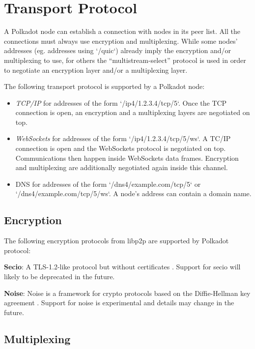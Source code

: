 \documentclass{book}
\newcommand{\tmem}[1]{{\em #1\/}}
\newcommand{\tmstrong}[1]{\textbf{#1}}
\begin{document}
\section{Transport Protocol}

A Polkadot node can establish a connection with nodes in its peer list. All
the connections must always use encryption and multiplexing. While some nodes'
addresses (eg. addresses using `/quic`) already imply the encryption and/or
multiplexing to use, for others the ``multistream-select'' protocol is used in
order to negotiate an encryption layer and/or a multiplexing layer.

The following transport protocol is supported by a Polkadot node:
\begin{itemize}
  \item {\tmem{TCP/IP}} for addresses of the form `/ip4/1.2.3.4/tcp/5`. Once
  the TCP connection is open, an encryption and a multiplexing layers are
  negotiated on top.
  
  \item {\tmem{WebSockets}} for addresses of the form `/ip4/1.2.3.4/tcp/5/ws`.
  A TC/IP connection is open and the WebSockets protocol is negotiated on top.
  Communications then happen inside WebSockets data frames. Encryption and
  multiplexing are additionally negotiated again inside this channel.
  
  \item DNS for addresses of the form `/dns4/example.com/tcp/5` or
  `/dns4/example.com/tcp/5/ws`. A node's address can contain a domain name.
\end{itemize}

\subsection{Encryption}

The following encryption protocols from libp2p are supported by Polkadot
protocol:

\item {\tmstrong{Secio}}: A TLS-1.2-like protocol but without certificates
{\cite{protocol_labs_libp2p_2019}}. Support for secio will likely to be
deprecated in the future.

\item {\tmstrong{Noise}}: Noise is a framework for crypto protocols based on
the Diffie-Hellman key agreement {\cite{perrin_noise_2018}}. Support for noise
is experimental and details may change in the future.

\subsection{Multiplexing}
\end{document}
